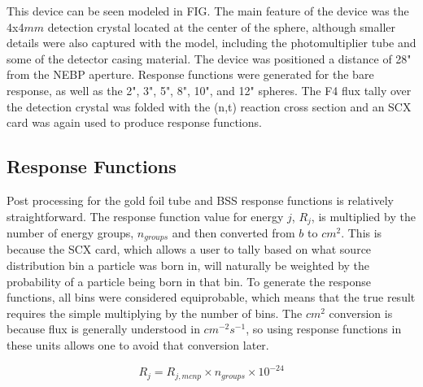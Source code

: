 This device can be seen modeled in FIG.
The main feature of the device was the 4x4$mm$ detection crystal located at the center of the sphere, although smaller details were also captured with the model, including the photomultiplier tube and some of the detector casing material.
The device was positioned a distance of 28" from the NEBP aperture.
Response functions were generated for the bare response, as well as the 2", 3", 5", 8", 10", and 12" spheres.
The F4 flux tally over the detection crystal was folded with the (n,t) reaction cross section and an SCX card was again used to produce response functions.



\subsection{Response Functions}


Post processing for the gold foil tube and BSS response functions is relatively straightforward.
The response function value for energy $j$, $R_j$, is multiplied by the number of energy groups, $n_{groups}$ and then converted from $b$ to $cm^2$.
This is because the SCX card, which allows a user to tally based on what source distribution bin a particle was born in, will naturally be weighted by the probability of a particle being born in that bin.
To generate the response functions, all bins were considered equiprobable, which means that the true result requires the simple multiplying by the number of bins.
The $cm^2$ conversion is because flux is generally understood in $cm^{-2}s^{-1}$, so using response functions in these units allows one to avoid that conversion later.

\begin{equation}
\label{eqn:postprocessing_au}
R_j = R_{j, mcnp} \times n_{groups} \times 10^{-24}
\end{equation}



